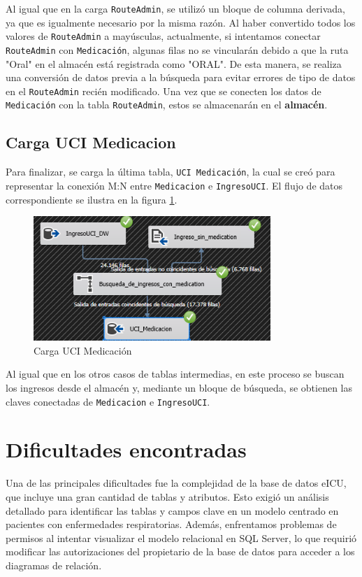\documentclass[12pt, a4paper, twoside]{article}
\begin{document}
	Al igual que en la carga \texttt{RouteAdmin}, se utilizó un bloque de columna derivada, ya que es igualmente necesario por la misma razón. Al haber convertido todos los valores de \texttt{RouteAdmin} a mayúsculas, actualmente, si intentamos conectar \texttt{RouteAdmin} con \texttt{Medicación}, algunas filas no se vincularán debido a que la ruta "Oral" en el almacén está registrada como "ORAL". De esta manera, se realiza una conversión de datos previa a la búsqueda para evitar errores de tipo de datos en el \texttt{RouteAdmin} recién modificado. Una vez que se conecten los datos de \texttt{Medicación} con la tabla \texttt{RouteAdmin}, estos se almacenarán en el \textbf{almacén}.
	
	
	\subsection{Carga UCI Medicacion}
	Para finalizar, se carga la última tabla, \texttt{UCI Medicación}, la cual se creó para representar la conexión M:N entre \texttt{Medicacion} e \texttt{IngresoUCI}. El flujo de datos correspondiente se ilustra en la figura \ref{fig:39}.
	
	\begin{figure}[H]
		\centering
		\includegraphics[width=0.8\textwidth]{image/119_Medicacion.png}
		\caption{Carga UCI Medicación}
		\label{fig:39}
	\end{figure}
	
	Al igual que en los otros casos de tablas intermedias, en este proceso se buscan los ingresos desde el almacén y, mediante un bloque de búsqueda, se obtienen las claves conectadas de \texttt{Medicacion} e \texttt{IngresoUCI}.
	
	
	\section{Dificultades encontradas}
	
	
	Una de las principales dificultades fue la complejidad de la base de datos eICU, que incluye una gran cantidad de tablas y atributos. Esto exigió un análisis detallado para identificar las tablas y campos clave en un modelo centrado en pacientes con enfermedades respiratorias. Además, enfrentamos problemas de permisos al intentar visualizar el modelo relacional en SQL Server, lo que requirió modificar las autorizaciones del propietario de la base de datos para acceder a los diagramas de relación.
	
\end{document}
